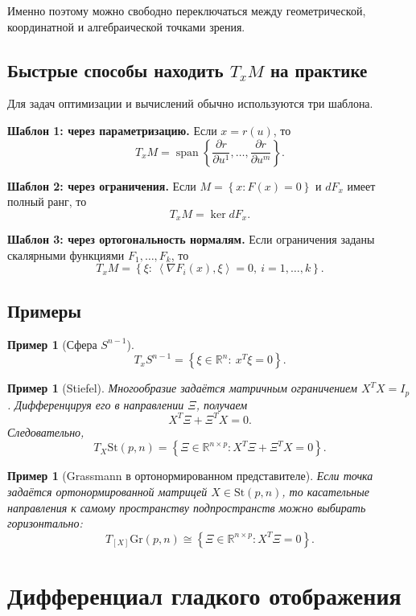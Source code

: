 \documentclass[12pt,a4paper]{article}
\theoremstyle{rudef}
\newtheorem{example}[definition]{Пример}
\theoremstyle{ruplain}
\newcommand{\R}{\mathbb{R}}
\newcommand{\Span}{\operatorname{span}}
\newcommand{\St}{\mathrm{St}}
\newcommand{\Gr}{\mathrm{Gr}}
\newcommand{\ip}[2]{\left\langle #1,#2\right\rangle}
\newcommand{\set}[1]{\left\{#1\right\}}
\begin{document}
Именно поэтому можно свободно переключаться между геометрической, координатной и алгебраической точками зрения.

\subsection{Быстрые способы находить $T_xM$ на практике}

Для задач оптимизации и вычислений обычно используются три шаблона.

\begin{summarybox}
\textbf{Шаблон 1: через параметризацию.}
Если $x=r(u)$, то
\[
T_xM = \Span\set{\frac{\partial r}{\partial u^1},\dots,\frac{\partial r}{\partial u^m}}.
\]

\textbf{Шаблон 2: через ограничения.}
Если $M=\set{x:F(x)=0}$ и $dF_x$ имеет полный ранг, то
\[
T_xM=\ker dF_x.
\]

\textbf{Шаблон 3: через ортогональность нормалям.}
Если ограничения заданы скалярными функциями $F_1,\dots,F_k$, то
\[
T_xM = \set{\xi:\ \ip{\nabla F_i(x)}{\xi}=0,\ i=1,\dots,k}.
\]
\end{summarybox}

\subsection{Примеры}

\begin{example}[Сфера $S^{n-1}$]
\[
T_xS^{n-1}=\set{\xi\in \R^n:\ x^T\xi=0}.
\]
\end{example}

\begin{example}[Stiefel]
Многообразие задаётся матричным ограничением $X^TX=I_p$. Дифференцируя его в направлении $\Xi$, получаем
\[
X^T\Xi+\Xi^TX=0.
\]
Следовательно,
\[
T_X\St(p,n)=\set{\Xi\in \R^{n\times p}: X^T\Xi+\Xi^TX=0}.
\]
\end{example}

\begin{example}[Grassmann в ортонормированном представителе]
Если точка задаётся ортонормированной матрицей $X\in \St(p,n)$, то касательные направления к самому пространству подпространств можно выбирать горизонтально:
\[
T_{[X]}\Gr(p,n)\cong \set{\Xi\in \R^{n\times p}: X^T\Xi=0}.
\]
\end{example}

\section{Дифференциал гладкого отображения}
\end{document}
